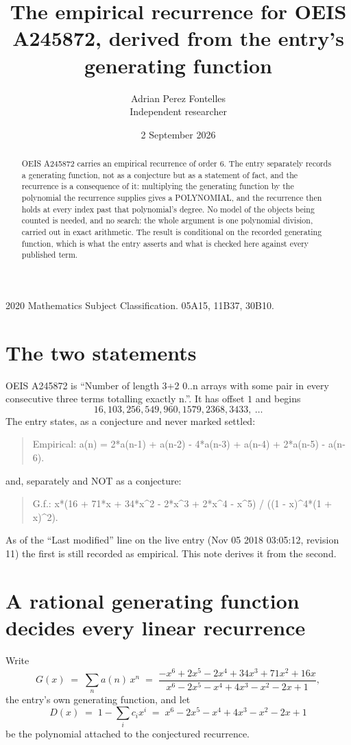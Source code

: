 \documentclass[11pt,a4paper]{article}
\title{The empirical recurrence for OEIS A245872, derived from the entry's generating function}
\author{Adrian Perez Fontelles\\ \small Independent researcher}
\date{2 September 2026}
\theoremstyle{plain}
\theoremstyle{definition}
\begin{document}
\maketitle

\begin{abstract}
OEIS A245872 carries an empirical recurrence of order $6$. The entry separately records a
generating function, not as a conjecture but as a statement of fact, and the recurrence is a
consequence of it: multiplying the generating function by the polynomial the recurrence
supplies gives a POLYNOMIAL, and the recurrence then holds at every index past that
polynomial's degree. No model of the objects being counted is needed, and no search: the
whole argument is one polynomial division, carried out in exact arithmetic. The result is
conditional on the recorded generating function, which is what the entry asserts and what is
checked here against every published term.
\end{abstract}

\noindent\small 2020 Mathematics Subject Classification. 05A15, 11B37, 30B10.\normalsize

\section{The two statements}

OEIS A245872 is ``Number of length 3+2 0..n arrays with some pair in every consecutive three terms totalling exactly n.''. It has offset $1$ and begins
\[
16, 103, 256, 549, 960, 1579, 2368, 3433,\ \dots
\]
The entry states, as a conjecture and never marked settled:
\begin{quote}
Empirical: a(n) = 2*a(n-1) + a(n-2) - 4*a(n-3) + a(n-4) + 2*a(n-5) - a(n-6).
\end{quote}
and, separately and NOT as a conjecture:
\begin{quote}
G.f.: x*(16 + 71*x + 34*x\^{}2 - 2*x\^{}3 + 2*x\^{}4 - x\^{}5) / ((1 - x)\^{}4*(1 + x)\^{}2).
\end{quote}
As of the ``Last modified'' line on the live entry (Nov 05 2018 03:05:12, revision 11) the first is still
recorded as empirical. This note derives it from the second.

\section{A rational generating function decides every linear recurrence}

Write
\[
G(x)\;=\;\sum_{n}a(n)\,x^{n}\;=\;\frac{- x^{6} + 2 x^{5} - 2 x^{4} + 34 x^{3} + 71 x^{2} + 16 x}{x^{6} - 2 x^{5} - x^{4} + 4 x^{3} - x^{2} - 2 x + 1},
\]
the entry's own generating function, and let
\[
D(x)\;=\;1-\sum_i c_i x^{i}\;=\;x^{6} - 2 x^{5} - x^{4} + 4 x^{3} - x^{2} - 2 x + 1
\]
be the polynomial attached to the conjectured recurrence.
\end{document}
